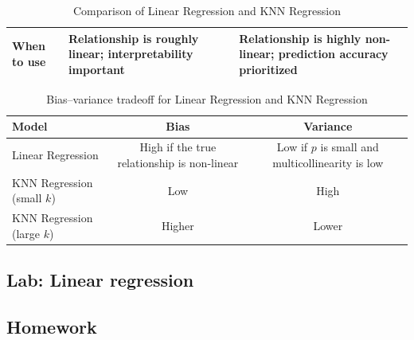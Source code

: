\documentclass{article}
\begin{document}
\begin{enumerate}
\begin{table}[h]
\begin{tabular}{|l|p{6cm}|p{6cm}|}
\hline
When to use & Relationship is roughly linear; interpretability important & Relationship is highly non-linear; prediction accuracy prioritized \\
\hline
\end{tabular}
\caption{Comparison of Linear Regression and KNN Regression}
\end{table}
\begin{table}[h]
\centering
\begin{tabular}{|l|c|c|}
\hline
\textbf{Model} & \textbf{Bias} & \textbf{Variance} \\
\hline
Linear Regression & High if the true relationship is non-linear & Low if $p$ is small and multicollinearity is low \\
\hline
KNN Regression (small $k$) & Low & High \\
\hline
KNN Regression (large $k$) & Higher & Lower \\
\hline
\end{tabular}
\caption{Bias--variance tradeoff for Linear Regression and KNN Regression}
\end{table}

\end{enumerate}

\subsection*{Lab: Linear regression}

\subsection*{Homework}
\end{document}
